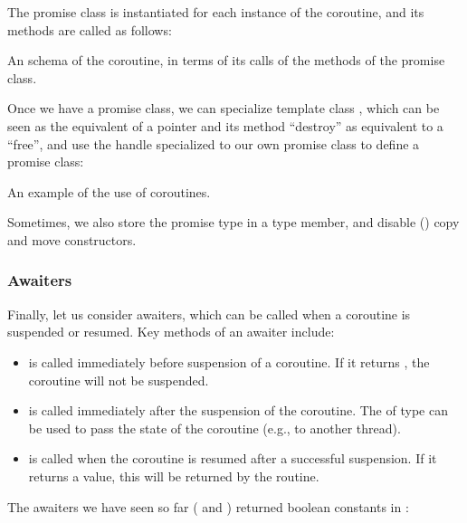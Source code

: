 \begin{itemize}
\begin{end}
The promise class is instantiated for each instance of the coroutine, and its methods are called as follows:

\raggedbottom
\begin{codebox}[]{}
\footnotesize An schema of the coroutine, in terms of its calls of the methods of the promise class.
\tcblower
{}
\end{codebox}

Once we have a promise class, we can specialize template class , which can be seen as the equivalent of a pointer and its method ``destroy'' as equivalent to a ``free'', and use the handle specialized to our own promise class to define a promise class:

\raggedbottom
\begin{codebox}[]{\href{https://godbolt.org/z/1nYdMPh3z}{\ExternalLink}}
\footnotesize An example of the use of coroutines.
\tcblower
{}
\end{codebox}

Sometimes, we also store the promise type in a  type member, and disable () copy and move constructors. 

\subsubsection{Awaiters}

Finally, let us consider awaiters, which can be called when a coroutine is suspended or resumed. 
Key methods of an awaiter include:
\begin{itemize}
\item {} is called immediately before suspension of a coroutine. If it returns , the coroutine will not be suspended. 
\item {} is called immediately after the suspension of the coroutine. The  of type  can be used to pass the state of the coroutine (e.g., to another thread). 
\item {} is called when the coroutine is resumed after a successful suspension. If it returns a value, this will be returned by the  routine. 
\end{itemize}
The awaiters we have seen so far ( and ) returned boolean constants in :


\end{end}
\end{itemize}
